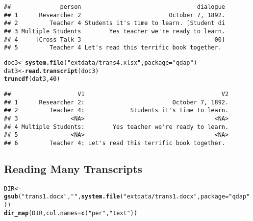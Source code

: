 \documentclass[a4paper]{article}\usepackage{graphicx, color}
\makeatletter
\newcommand{\hlfunctioncall}[1]{\textcolor[rgb]{0.501960784313725,0,0.329411764705882}{\textbf{#1}}}%
\newcommand{\hlstring}[1]{\textcolor[rgb]{0.6,0.6,1}{#1}}%
\newenvironment{kframe}{%
 \def\at@end@of@kframe{}%
 \ifinner\ifhmode%
  \def\at@end@of@kframe{\end{minipage}}%
  \begin{minipage}{\columnwidth}%
 \fi\fi%
 \def\FrameCommand##1{\hskip\@totalleftmargin \hskip-\fboxsep
 \colorbox{shadecolor}{##1}\hskip-\fboxsep
     \hskip-\linewidth \hskip-\@totalleftmargin \hskip\columnwidth}%
 \MakeFramed {\advance\hsize-\width
   \@totalleftmargin\z@ \linewidth\hsize
   \@setminipage}}%
 {\par\unskip\endMakeFramed%
 \at@end@of@kframe}
\newenvironment{knitrout}{}{} %
\makeatother
\begin{document}
\begin{knitrout}
\color{fgcolor}\begin{kframe}
\begin{verbatim}
##              person                                 dialogue
## 1      Researcher 2                         October 7, 1892.
## 2         Teacher 4 Students it's time to learn. [Student di
## 3 Multiple Students        Yes teacher we're ready to learn.
## 4     [Cross Talk 3                                      00]
## 5         Teacher 4 Let's read this terrific book together.
\end{verbatim}
\end{kframe}
\end{knitrout}


\begin{knitrout}
\color{fgcolor}\begin{kframe}
\begin{alltt}
doc3 <- \hlfunctioncall{system.file}(\hlstring{"extdata/trans4.xlsx"}, package = \hlstring{"qdap"})
dat3 <- \hlfunctioncall{read.transcript}(doc3)
\hlfunctioncall{truncdf}(dat3, 40)
\end{alltt}
\end{kframe}
\end{knitrout}


\begin{knitrout}
\color{fgcolor}\begin{kframe}
\begin{verbatim}
##                   V1                                       V2
## 1      Researcher 2:                         October 7, 1892.
## 2         Teacher 4:             Students it's time to learn.
## 3               <NA>                                     <NA>
## 4 Multiple Students:        Yes teacher we're ready to learn.
## 5               <NA>                                     <NA>
## 6         Teacher 4: Let's read this terrific book together.
\end{verbatim}
\end{kframe}
\end{knitrout}


\subsection*{Reading Many Transcripts}

\begin{knitrout}
\color{fgcolor}\begin{kframe}
\begin{alltt}
DIR <- \hlfunctioncall{gsub}(\hlstring{"trans1.docx"}, \hlstring{""}, \hlfunctioncall{system.file}(\hlstring{"extdata/trans1.docx"}, package = \hlstring{"qdap"}))
\hlfunctioncall{dir_map}(DIR, col.names = \hlfunctioncall{c}(\hlstring{"per"}, \hlstring{"text"}))
\end{alltt}
\end{kframe}
\end{knitrout}
\end{document}
